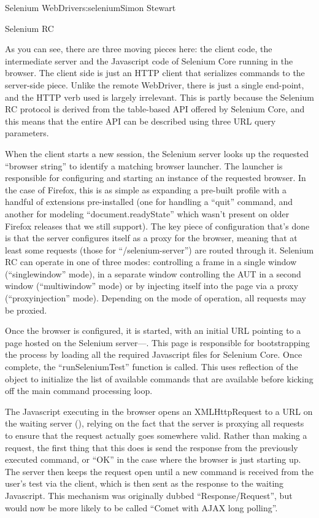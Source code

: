\begin{aosachapter}{Selenium WebDriver}{s:selenium}{Simon Stewart}
\begin{aosasect1}{Selenium RC}

As you can see, there are three moving pieces here: the client code,
the intermediate server and the Javascript code of Selenium Core
running in the browser. The client side is just an HTTP client that
serializes commands to the server-side piece. Unlike the remote
WebDriver, there is just a single end-point, and the HTTP verb used is
largely irrelevant. This is partly because the Selenium RC protocol is
derived from the table-based API offered by Selenium Core, and this
means that the entire API can be described using three URL query
parameters.

When the client starts a new session, the Selenium server looks up the
requested ``browser string'' to identify a matching browser
launcher. The launcher is responsible for configuring and starting an
instance of the requested browser. In the case of Firefox, this is as
simple as expanding a pre-built profile with a handful of extensions
pre-installed (one for handling a ``quit'' command, and another for
modeling ``document.readyState'' which wasn't present on older
Firefox releases that we still support). The key piece of
configuration that's done is that the server configures itself as a
proxy for the browser, meaning that at least some requests (those for
``/selenium-server'') are routed through it.  Selenium RC can operate
in one of three modes: controlling a frame in a single window
(``singlewindow'' mode), in a separate window controlling the AUT in a
second window (``multiwindow'' mode) or by injecting itself into the
page via a proxy (``proxyinjection'' mode). Depending on the mode of
operation, all requests may be proxied.

Once the browser is configured, it is started, with an initial URL
pointing to a page hosted on the Selenium
server---. This page is responsible for
bootstrapping the process by loading all the required Javascript files
for Selenium Core. Once complete, the ``runSeleniumTest'' function is
called. This uses reflection of the  object to
initialize the list of available commands that are available before
kicking off the main command processing loop.

The Javascript executing in the browser opens an XMLHttpRequest to a
URL on the waiting server (), relying on
the fact that the server is proxying all requests to ensure that the
request actually goes somewhere valid. Rather than making a request,
the first thing that this does is send the response from the
previously executed command, or ``OK'' in the case where the browser
is just starting up. The server then keeps the request open until a
new command is received from the user's test via the client, which is
then sent as the response to the waiting Javascript.  This mechanism
was originally dubbed ``Response/Request'', but would now be more
likely to be called ``Comet with AJAX long polling''.


\end{aosasect1}
\end{aosachapter}
